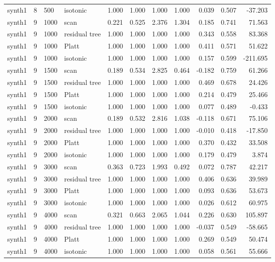 \begin{tabular}{lrllrrrrrrr}
synth1 & 8 & 500 & isotonic & 1.000 & 1.000 & 1.000 & 1.000 & 0.039 & 0.507 & -37.203 \\
synth1 & 9 & 1000 & scan & 0.221 & 0.525 & 2.376 & 1.304 & 0.185 & 0.741 & 71.563 \\
synth1 & 9 & 1000 & residual tree & 1.000 & 1.000 & 1.000 & 1.000 & 0.343 & 0.558 & 83.368 \\
synth1 & 9 & 1000 & Platt & 1.000 & 1.000 & 1.000 & 1.000 & 0.411 & 0.571 & 51.622 \\
synth1 & 9 & 1000 & isotonic & 1.000 & 1.000 & 1.000 & 1.000 & 0.157 & 0.599 & -211.695 \\
synth1 & 9 & 1500 & scan & 0.189 & 0.534 & 2.825 & 0.464 & -0.182 & 0.759 & 61.266 \\
synth1 & 9 & 1500 & residual tree & 1.000 & 1.000 & 1.000 & 1.000 & 0.469 & 0.678 & 24.426 \\
synth1 & 9 & 1500 & Platt & 1.000 & 1.000 & 1.000 & 1.000 & 0.214 & 0.479 & 25.466 \\
synth1 & 9 & 1500 & isotonic & 1.000 & 1.000 & 1.000 & 1.000 & 0.077 & 0.489 & -0.433 \\
synth1 & 9 & 2000 & scan & 0.189 & 0.532 & 2.816 & 1.038 & -0.118 & 0.671 & 75.106 \\
synth1 & 9 & 2000 & residual tree & 1.000 & 1.000 & 1.000 & 1.000 & -0.010 & 0.418 & -17.850 \\
synth1 & 9 & 2000 & Platt & 1.000 & 1.000 & 1.000 & 1.000 & 0.370 & 0.432 & 33.508 \\
synth1 & 9 & 2000 & isotonic & 1.000 & 1.000 & 1.000 & 1.000 & 0.179 & 0.479 & 3.874 \\
synth1 & 9 & 3000 & scan & 0.363 & 0.723 & 1.993 & 0.492 & 0.072 & 0.787 & 42.217 \\
synth1 & 9 & 3000 & residual tree & 1.000 & 1.000 & 1.000 & 1.000 & 0.406 & 0.636 & 39.989 \\
synth1 & 9 & 3000 & Platt & 1.000 & 1.000 & 1.000 & 1.000 & 0.093 & 0.636 & 53.673 \\
synth1 & 9 & 3000 & isotonic & 1.000 & 1.000 & 1.000 & 1.000 & 0.026 & 0.612 & 60.975 \\
synth1 & 9 & 4000 & scan & 0.321 & 0.663 & 2.065 & 1.044 & 0.226 & 0.630 & 105.897 \\
synth1 & 9 & 4000 & residual tree & 1.000 & 1.000 & 1.000 & 1.000 & -0.037 & 0.549 & -58.665 \\
synth1 & 9 & 4000 & Platt & 1.000 & 1.000 & 1.000 & 1.000 & 0.269 & 0.549 & 50.474 \\
synth1 & 9 & 4000 & isotonic & 1.000 & 1.000 & 1.000 & 1.000 & 0.058 & 0.561 & 55.666 \\

\end{tabular}
